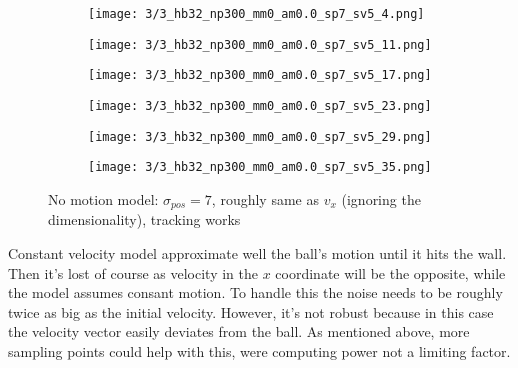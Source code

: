 \documentclass[10pt,a4paper,twoside]{article}
\newcommand{\sweepsize}{0.26}
\begin{document}
\begin{figure}[h]
    \centering
    \begin{subfigure}{\sweepsize\textwidth}
    \texttt{[image: 3/3\_hb32\_np300\_mm0\_am0.0\_sp7\_sv5\_4.png]} 
    \end{subfigure}
    \begin{subfigure}{\sweepsize\textwidth}
    \texttt{[image: 3/3\_hb32\_np300\_mm0\_am0.0\_sp7\_sv5\_11.png]} 
    \end{subfigure}
    \begin{subfigure}{\sweepsize\textwidth}
    \texttt{[image: 3/3\_hb32\_np300\_mm0\_am0.0\_sp7\_sv5\_17.png]} 
    \end{subfigure}
    \begin{subfigure}{\sweepsize\textwidth}
    \texttt{[image: 3/3\_hb32\_np300\_mm0\_am0.0\_sp7\_sv5\_23.png]} 
    \end{subfigure}
    \begin{subfigure}{\sweepsize\textwidth}
    \texttt{[image: 3/3\_hb32\_np300\_mm0\_am0.0\_sp7\_sv5\_29.png]} 
    \end{subfigure}
    \begin{subfigure}{\sweepsize\textwidth}
    \texttt{[image: 3/3\_hb32\_np300\_mm0\_am0.0\_sp7\_sv5\_35.png]} 
    \end{subfigure}
    \caption{No motion model: $\sigma_{pos}=7$, roughly same as $v_x$ (ignoring the dimensionality), tracking works}

\end{figure}

Constant velocity model approximate well the ball's motion until it hits the
wall. Then it's lost of course as velocity in the $x$ coordinate will be the
opposite, while the model assumes consant motion.
To handle this the noise needs to be roughly twice as big as the initial
velocity. However, it's not robust because in this case the velocity vector easily deviates from the
ball. As mentioned above, more sampling points could help with this, were computing power not a limiting factor.
\end{document}
